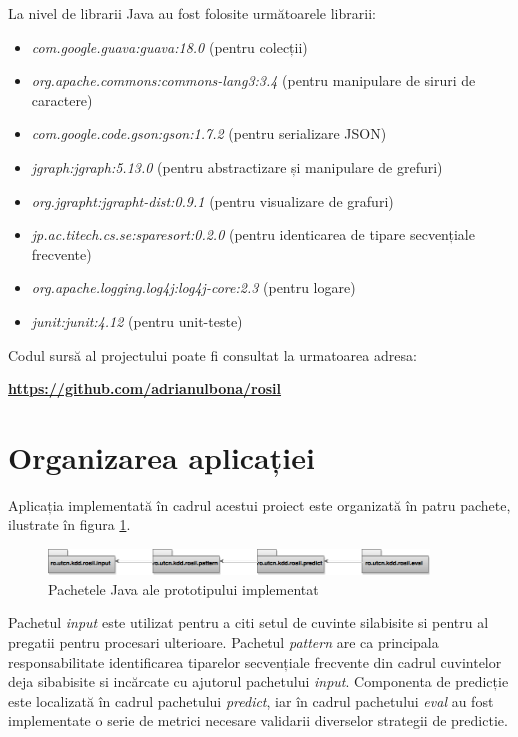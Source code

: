 La nivel de librarii Java au fost folosite următoarele librarii:

\begin{itemize}
    \item \textit{com.google.guava:guava:18.0} (pentru colecții)
	\item \textit{org.apache.commons:commons-lang3:3.4} (pentru manipulare de siruri de caractere)
    \item \textit{com.google.code.gson:gson:1.7.2} (pentru serializare JSON)
    \item \textit{jgraph:jgraph:5.13.0} (pentru abstractizare și manipulare de grefuri)
	\item \textit{org.jgrapht:jgrapht-dist:0.9.1} (pentru visualizare de 
grafuri)
	\item \textit{jp.ac.titech.cs.se:sparesort:0.2.0} (pentru identicarea de tipare secvențiale frecvente)
	\item \textit{org.apache.logging.log4j:log4j-core:2.3} (pentru logare)
    \item \textit{junit:junit:4.12} (pentru unit-teste)
\end{itemize}

Codul sursă al projectului poate fi consultat la urmatoarea adresa: \begin{center}
\textbf{\href{https://github.com/adrianulbona/rosil}{https://github.com/adrianulbona/rosil}}
\end{center}

\section{Organizarea aplicației}

Aplicația implementată în cadrul acestui proiect este organizată în patru pachete, ilustrate în figura \ref{fig:rosil-packages}.

\begin{figure}[h!]
    \centering
    \includegraphics[width=0.9\textwidth]{figures/rosil-packages.png}
    \caption{Pachetele Java ale prototipului implementat}
    \label{fig:rosil-packages}
\end{figure}

Pachetul \textit{input} este utilizat pentru a citi setul de cuvinte silabisite si pentru al pregatii pentru procesari ulterioare. Pachetul \textit{pattern} are ca principala responsabilitate identificarea tiparelor secvențiale frecvente din cadrul cuvintelor deja sibabisite si incărcate cu ajutorul pachetului \textit{input}. Componenta de predicție este localizată în cadrul pachetului \textit{predict}, iar în cadrul pachetului \textit{eval} au fost implementate o serie de metrici necesare validarii diverselor strategii de predictie.

